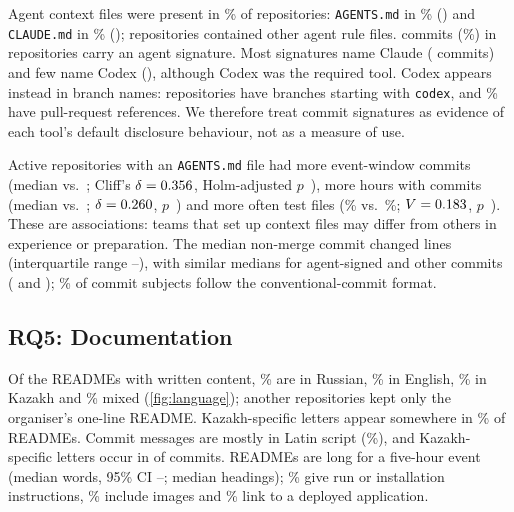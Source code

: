 \documentclass{article}
\begin{document}
Agent context files were present in \NAnyAgentFilePct\% of repositories: \texttt{AGENTS.md} in \NAgentsMdPct\% (\NAgentsMdN) and \texttt{CLAUDE.md} in \NClaudeMdPct\% (\NClaudeMdN); \NOtherAgentFiles{} repositories contained other agent rule files. \NAgentSignedCommits{} commits (\NPctAgentSignedCommits\%) in \NReposAgentSignedN{} repositories carry an agent signature. Most signatures name Claude (\NAgentSignedByKindClaude{} commits) and few name Codex (\NAgentSignedByKindCodex), although Codex was the required tool. Codex appears instead in branch names: \NReposCodexBranch{} repositories have branches starting with \texttt{codex}, and \NReposPrRefsPct\% have pull-request references. We therefore treat commit signatures as evidence of each tool's default disclosure behaviour, not as a measure of use.

Active repositories with an \texttt{AGENTS.md} file had more event-window commits (median \NAgentsMdAssocCommitsMedianWith{} vs.\ \NAgentsMdAssocCommitsMedianWithout; Cliff's $\delta = \num{0.356}$, Holm-adjusted $p$~\NAgentsMdAssocCommitsP), more hours with commits (median \NAgentsMdAssocHoursMedianWith{} vs.\ \NAgentsMdAssocHoursMedianWithout; $\delta = \num{0.260}$, $p$~\NAgentsMdAssocHoursP) and more often test files (\NAgentsMdAssocTestsPctWith\% vs.\ \NAgentsMdAssocTestsPctWithout\%; $V = \num{0.183}$, $p$~\NAgentsMdAssocTestsP). These are associations: teams that set up context files may differ from others in experience or preparation. The median non-merge commit changed \NCommitSizeMedianAll{} lines (interquartile range \NCommitSizeQOneAll--\NCommitSizeQThreeAll), with similar medians for agent-signed and other commits (\NCommitSizeMedianSigned{} and \NCommitSizeMedianUnsigned); \NConventionalCommitsPct\% of commit subjects follow the conventional-commit format.

\subsection{RQ5: Documentation}

Of the \NReadmeWrittenN{} READMEs with written content, \NReadmeRussianPct\% are in Russian, \NReadmeEnglishPct\% in English, \NReadmeKazakhPct\% in Kazakh and \NReadmeMixedPct\% mixed (\cref{fig:language}); another \NReadmeLanguageCountsTemplate{} repositories kept only the organiser's one-line README. Kazakh-specific letters appear somewhere in \NReadmeAnyKazakhLetterPct\% of READMEs. Commit messages are mostly in Latin script (\NCommitScriptLatinPct\%), and Kazakh-specific letters occur in \NCommitScriptKazakhN{} of \NTeamCommitsTotal{} commits. READMEs are long for a five-hour event (median \NReadmeWordsMedian{} words, 95\% CI \NReadmeWordsLo--\NReadmeWordsHi; median \NReadmeHeadingsMedian{} headings); \NReadmeInstallInstructionsPct\% give run or installation instructions, \NReadmeImagesPct\% include images and \NReadmeDeployedLinkPct\% link to a deployed application.
\end{document}
